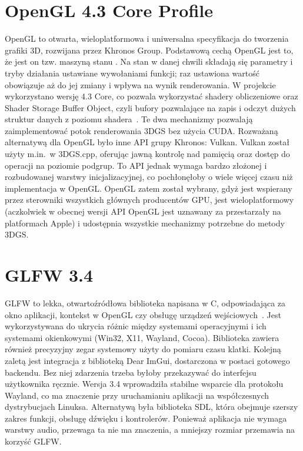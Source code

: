 \section{OpenGL 4.3 Core Profile}
\label{sec: opengl}
OpenGL to otwarta, wieloplatformowa i uniwersalna specyfikacja do tworzenia grafiki 3D, rozwijana przez Khronos Group. Podstawową cechą OpenGL jest to, że jest on tzw. maszyną stanu . Na stan w danej chwili składają się parametry i tryby działania ustawiane wywołaniami funkcji; raz ustawiona wartość obowiązuje aż do jej zmiany i wpływa na wynik renderowania. W projekcie wykorzystano wersję 4.3 Core, co pozwala wykorzystać shadery obliczeniowe  oraz Shader Storage Buffer Object, czyli bufory pozwalające na zapis i odczyt dużych struktur danych z poziomu shadera~\cite{khronos2013opengl43}. Te dwa mechanizmy pozwalają zaimplementować potok renderowania 3DGS bez użycia CUDA. Rozważaną alternatywą dla OpenGL było inne API grupy Khronos: Vulkan. Vulkan został użyty m.in.\ w 3DGS.cpp, oferując jawną kontrolę nad pamięcią oraz dostęp do operacji na poziomie podgrup. To API jednak wymaga bardzo złożonej i rozbudowanej warstwy inicjalizacyjnej, co pochłonęłoby o wiele więcej czasu niż implementacja w OpenGL. OpenGL zatem został wybrany, gdyż jest wspierany przez sterowniki wszystkich głównych producentów GPU, jest wieloplatformowy (aczkolwiek w obecnej wersji API OpenGL jest uznawany za przestarzały na platformach Apple) i udostępnia wszystkie mechanizmy potrzebne do metody 3DGS.
\section{GLFW 3.4}
\label{glfw}
GLFW to lekka, otwartoźródłowa biblioteka napisana w C, odpowiadająca za okno aplikacji, kontekst w OpenGL czy obsługę urządzeń wejściowych~\cite{glfw34docs}. Jest wykorzystywana do ukrycia różnic między systemami operacyjnymi i ich systemami okienkowymi (Win32, X11, Wayland, Cocoa). Biblioteka zawiera również precyzyjny zegar systemowy użyty do pomiaru czasu klatki. Kolejną zaletą jest integracja z biblioteką Dear ImGui, dostarczona w postaci gotowego backendu. Bez niej zdarzenia trzeba byłoby przekazywać do interfejsu użytkownika ręcznie. Wersja 3.4 wprowadziła stabilne wsparcie dla protokołu Wayland, co ma znaczenie przy uruchamianiu aplikacji na współczesnych dystrybucjach Linuksa. Alternatywą była biblioteka SDL, która obejmuje szerszy zakres funkcji, obsługę dźwięku i kontrolerów. Ponieważ aplikacja nie wymaga warstwy audio, przewaga ta nie ma znaczenia, a mniejszy rozmiar przemawia na korzyść GLFW.
